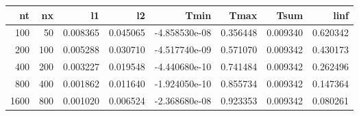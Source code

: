 \begin{tabular}{rrrrrrrr}
\toprule
   nt &   nx &        l1 &        l2 &          Tmin &      Tmax &      Tsum &      linf \\
\midrule
  100 &   50 &  0.008365 &  0.045065 & -4.858530e-08 &  0.356448 &  0.009340 &  0.620342 \\
  200 &  100 &  0.005288 &  0.030710 & -4.517740e-09 &  0.571070 &  0.009342 &  0.430173 \\
  400 &  200 &  0.003227 &  0.019548 & -4.440680e-10 &  0.741484 &  0.009342 &  0.262496 \\
  800 &  400 &  0.001862 &  0.011640 & -1.924050e-10 &  0.855734 &  0.009342 &  0.147364 \\
 1600 &  800 &  0.001020 &  0.006524 & -2.368680e-08 &  0.923353 &  0.009342 &  0.080261 \\
\bottomrule
\end{tabular}
